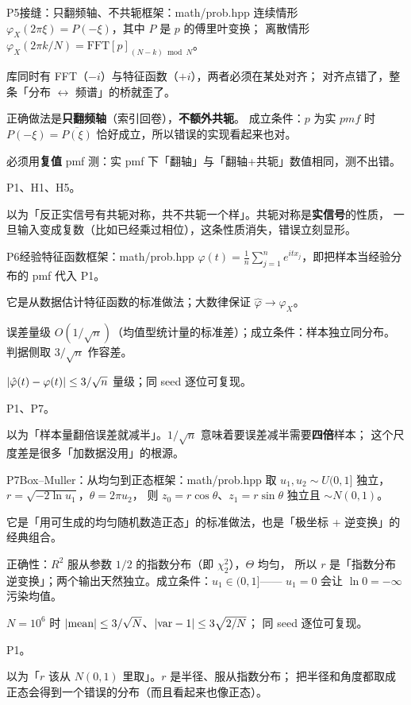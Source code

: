 \begin{know}{P5}{接缝：只翻频轴、不共轭}{框架：math/prob.hpp}
 连续情形 $\varphi_X(2\pi\xi)=P(-\xi)$，其中 $P$ 是 $p$ 的傅里叶变换；
离散情形 $\varphi_X(2\pi k/N)=\mathrm{FFT}[p]_{(N-k)\bmod N}$。

 库同时有 FFT（$-i$）与特征函数（$+i$），两者必须在某处对齐；
对齐点错了，整条「分布 $\leftrightarrow$ 频谱」的桥就歪了。

 正确做法是\textbf{只翻频轴}（索引回卷），\textbf{不额外共轭}。
成立条件：$p$ 为实 $pmf$ 时 $P(-\xi)=\overline{P(\xi)}$ 恰好成立，所以错误的实现看起来也对。

 必须用\textbf{复值} pmf 测：实 pmf 下「翻轴」与「翻轴+共轭」数值相同，测不出错。

 P1、H1、H5。

 以为「反正实信号有共轭对称，共不共轭一个样」。共轭对称是\textbf{实信号}的性质，
一旦输入变成复数（比如已经乘过相位），这条性质消失，错误立刻显形。
\end{know}

\begin{know}{P6}{经验特征函数}{框架：math/prob.hpp}
 $\hat\varphi(t)=\frac1n\sum_{j=1}^{n}e^{itx_j}$，即把样本当经验分布的 pmf 代入 P1。

 它是从数据估计特征函数的标准做法；大数律保证 $\hat\varphi\to\varphi_X$。

 误差量级 $O(1/\sqrt n)$（均值型统计量的标准差）；成立条件：样本独立同分布。
判据侧取 $3/\sqrt n$ 作容差。

 $\left\lvert \hat\varphi(t)-\varphi(t)\right\rvert\le3/\sqrt n$ 量级；同 seed 逐位可复现。

 P1、P7。

 以为「样本量翻倍误差就减半」。$1/\sqrt n$ 意味着要误差减半需要\textbf{四倍}样本；
这个尺度差是很多「加数据没用」的根源。
\end{know}

\begin{know}{P7}{Box--Muller：从均匀到正态}{框架：math/prob.hpp}
 取 $u_1,u_2\sim U(0,1]$ 独立，$r=\sqrt{-2\ln u_1}$，$\theta=2\pi u_2$，
则 $z_0=r\cos\theta$、$z_1=r\sin\theta$ 独立且 $\sim N(0,1)$。

 它是「用可生成的均匀随机数造正态」的标准做法，也是「极坐标 + 逆变换」的经典组合。

 正确性：$R^{2}$ 服从参数 $1/2$ 的指数分布（即 $\chi^{2}_{2}$），$\Theta$ 均匀，
所以 $r$ 是「指数分布逆变换」；两个输出天然独立。成立条件：$u_1\in(0,1]$——
$u_1=0$ 会让 $\ln0=-\infty$ 污染均值。

 $N=10^{6}$ 时 $\left\lvert \text{mean}\right\rvert\le3/\sqrt N$、$\left\lvert \text{var}-1\right\rvert\le3\sqrt{2/N}$；
同 seed 逐位可复现。

 P1。

 以为「$r$ 该从 $N(0,1)$ 里取」。$r$ 是半径、服从指数分布；
把半径和角度都取成正态会得到一个错误的分布（而且看起来也像正态）。
\end{know}

